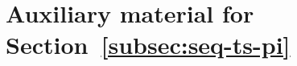 






              










 

\section{Auxiliary material for Section~\ref{subsec:seq-ts-pi}}
\label{a:behav}

